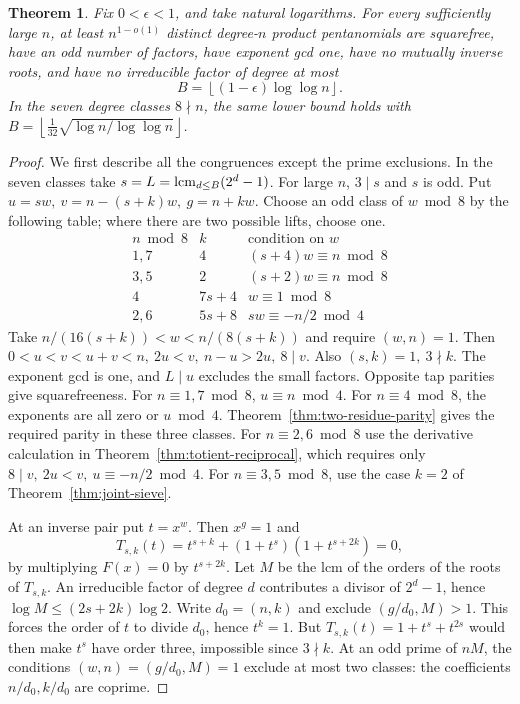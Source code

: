 \documentclass[11pt]{article}
\newtheorem{theorem}{Theorem}
\begin{document}
\begin{theorem}\label{thm:growing-joint}
Fix \(0<\epsilon<1\), and take natural logarithms. For every
sufficiently large \(n\), at least \(n^{1-o(1)}\) distinct
degree-\(n\) product pentanomials are squarefree, have an odd number
of factors, have exponent gcd one, have no mutually inverse roots,
and have no irreducible factor of degree at most
\[
 B=\left\lfloor(1-\epsilon)\log\log n\right\rfloor .
\]
In the seven degree classes \(8\nmid n\), the same lower bound holds
with \(B=\left\lfloor\frac1{32}\sqrt{\log n/\log\log n}\right\rfloor\).
\end{theorem}
\begin{proof}
We first describe all the congruences except the prime exclusions.
In the seven classes take \(s=L=\mathop{\rm lcm}_{d\le B}(2^d-1)\).
For large \(n\), \(3\mid s\) and \(s\) is odd. Put
\(u=sw,\ v=n-(s+k)w,\ g=n+kw\). Choose an odd class of \(w\bmod8\)
by the following table; where there are two possible lifts, choose one.
\[
\begin{array}{c|c|l}
 n\bmod8 & k &\text{condition on }w\\\hline
 1,7 &4 &(s+4)w\equiv n\bmod8\\
 3,5 &2 &(s+2)w\equiv n\bmod8\\
 4   &7s+4 &w\equiv1\bmod8\\
 2,6 &5s+8 &sw\equiv-n/2\bmod4
\end{array}
\]
Take \(n/(16(s+k))<w<n/(8(s+k))\) and require \((w,n)=1\).
Then \(0<u<v<u+v<n,\ 2u<v,\ n-u>2u,\ 8\mid v\).
Also \((s,k)=1,\ 3\nmid k\). The exponent gcd is one, and \(L\mid u\)
excludes the small factors. Opposite tap parities give squarefreeness.
For \(n\equiv1,7\bmod8\), \(u\equiv n\bmod4\).
For \(n\equiv4\bmod8\), the exponents are all zero or \(u\bmod4\).
Theorem~\ref{thm:two-residue-parity} gives the required parity in these
three classes. For \(n\equiv2,6\bmod8\) use the derivative calculation
in Theorem~\ref{thm:totient-reciprocal}, which requires only
\(8\mid v,\ 2u<v,\ u\equiv-n/2\bmod4\).
For \(n\equiv3,5\bmod8\), use the case \(k=2\) of
Theorem~\ref{thm:joint-sieve}.

At an inverse pair put \(t=x^w\). Then \(x^g=1\) and
\[
 T_{s,k}(t)=t^{s+k}+(1+t^s)(1+t^{s+2k})=0,
\]
by multiplying \(F(x)=0\) by \(t^{s+2k}\).
Let \(M\) be the lcm of the orders of the roots of \(T_{s,k}\).
An irreducible factor of degree \(d\) contributes a divisor of
\(2^d-1\), hence \(\log M\le(2s+2k)\log2\).
Write \(d_0=(n,k)\) and exclude \((g/d_0,M)>1\).
This forces the order of \(t\) to divide \(d_0\), hence \(t^k=1\).
But \(T_{s,k}(t)=1+t^s+t^{2s}\) would then make \(t^s\) have order
three, impossible since \(3\nmid k\). At an odd prime of \(nM\),
the conditions \((w,n)=(g/d_0,M)=1\) exclude at most two classes:
the coefficients \(n/d_0,k/d_0\) are coprime.


\end{proof}
\end{document}
